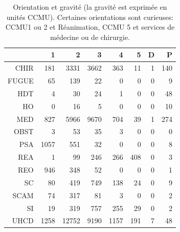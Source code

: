 \documentclass[12pt,english,french,twoside]{book}\usepackage[]{graphicx}\usepackage[]{color}
\begin{document}
\begin{table}[ht]
\centering
\begin{tabular}{rrrrrrrr}
  \hline
 & 1 & 2 & 3 & 4 & 5 & D & P \\ 
  \hline
CHIR & 181 & 3331 & 3662 & 363 &  11 &   1 & 140 \\ 
  FUGUE &  65 & 139 &  22 &   0 &   0 &   0 &   9 \\ 
  HDT &   4 &  30 &  24 &   1 &   0 &   0 &  48 \\ 
  HO &   0 &  16 &   5 &   0 &   0 &   0 &  10 \\ 
  MED & 827 & 5966 & 9670 & 704 &  39 &   1 & 274 \\ 
  OBST &   3 &  53 &  35 &   3 &   0 &   0 &   0 \\ 
  PSA & 1057 & 551 &  32 &   0 &   0 &   0 &   8 \\ 
  REA &   1 &  99 & 246 & 266 & 408 &   0 &   3 \\ 
  REO & 946 & 348 &  52 &   0 &   0 &   0 &   1 \\ 
  SC &  80 & 419 & 749 & 138 &  24 &   0 &   9 \\ 
  SCAM &  74 & 317 &  81 &   3 &   0 &   0 &   2 \\ 
  SI &  19 & 319 & 757 & 255 &  29 &   0 &   2 \\ 
  UHCD & 1258 & 12752 & 9190 & 1157 & 191 &   7 &  48 \\ 
   \hline
\end{tabular}
\caption[Orientation et gravité]{Orientation et gravité (la gravité est exprimée en unités CCMU). Certaines orientations sont curieuses: CCMU1 ou 2 et Réanimation, CCMU 5 et services de médecine ou de chirurgie.} 
\label{tab:orient_gravite}
\end{table}
\end{document}

